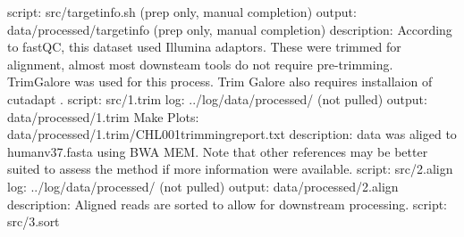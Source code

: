 \markdownRendererUlItem script: src/target\markdownRendererUnderscore{}info.sh (prep only, manual completion)\markdownRendererUlItemEnd 
\markdownRendererUlItem output: data/processed/target\markdownRendererUnderscore{}info (prep only, manual completion)\markdownRendererUlItemEnd 
\markdownRendererUlEndTight \markdownRendererInterblockSeparator
{}\markdownRendererInterblockSeparator
{}\markdownRendererUlBegin
\markdownRendererUlItem description: According to fastQC, this dataset used Illumina adaptors. These were trimmed for alignment, almost most downsteam tools do not require pre-trimming. TrimGalore was used for this process.  Trim Galore also requires installaion of cutadapt .\markdownRendererUlItemEnd 
\markdownRendererUlItem script: src/1.trim\markdownRendererUlItemEnd 
\markdownRendererUlItem log: ../log/data/processed/ (not pulled)\markdownRendererUlItemEnd 
\markdownRendererUlItem output: data/processed/1.trim\markdownRendererUlItemEnd 
\markdownRendererUlEnd \markdownRendererInterblockSeparator
{}Make Plots: data/processed/1.trim/CHL001trimming\markdownRendererUnderscore{}report.txt\markdownRendererInterblockSeparator
{}\markdownRendererInterblockSeparator
{}\markdownRendererUlBeginTight
\markdownRendererUlItem description: data was aliged to humanv37.fasta using BWA MEM. Note that other references may be better suited to assess the method if more information were available.\markdownRendererUlItemEnd 
\markdownRendererUlItem script: src/2.align\markdownRendererUlItemEnd 
\markdownRendererUlItem log: ../log/data/processed/ (not pulled)\markdownRendererUlItemEnd 
\markdownRendererUlItem output: data/processed/2.align\markdownRendererUlItemEnd 
\markdownRendererUlEndTight \markdownRendererInterblockSeparator
{}\markdownRendererInterblockSeparator
{}\markdownRendererUlBeginTight
\markdownRendererUlItem description: Aligned reads are sorted to allow for downstream processing.\markdownRendererUlItemEnd 
\markdownRendererUlItem script: src/3.sort\markdownRendererUlItemEnd 
